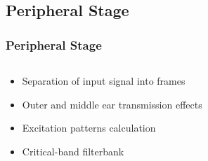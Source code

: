 \documentclass{beamer}
\begin{document}
\subsection{Peripheral Stage}
\begin{frame}
  \frametitle{Peripheral Stage}
  \begin{columns}
    \begin{column}{0.5\textwidth}
      \begin{itemize}
        \item<1-> Separation of input signal into frames
        \item<2-> Outer and middle ear transmission effects
        \item<3-> Excitation patterns calculation
        \item<4-> Critical-band filterbank
      \end{itemize}
    \end{column}
    \begin{column}{0.5\textwidth}
    \end{column}
  \end{columns}
\end{frame}
\end{document}
